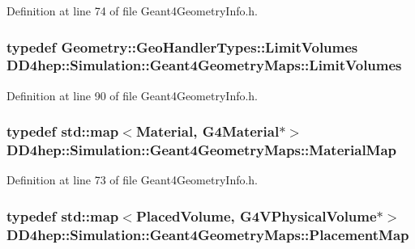 Definition at line 74 of file Geant4GeometryInfo.h.\hypertarget{namespace_d_d4hep_1_1_simulation_1_1_geant4_geometry_maps_a3b9008449a71468a115373b9819457df}{
\subsubsection[{LimitVolumes}]{\setlength{\rightskip}{0pt plus 5cm}typedef {\bf Geometry::GeoHandlerTypes::LimitVolumes} {\bf DD4hep::Simulation::Geant4GeometryMaps::LimitVolumes}}}
\label{namespace_d_d4hep_1_1_simulation_1_1_geant4_geometry_maps_a3b9008449a71468a115373b9819457df}


Definition at line 90 of file Geant4GeometryInfo.h.\hypertarget{namespace_d_d4hep_1_1_simulation_1_1_geant4_geometry_maps_a0ae377c64e684c47bd3045a9d3d8e248}{
\subsubsection[{MaterialMap}]{\setlength{\rightskip}{0pt plus 5cm}typedef std::map$<$Material, G4Material$\ast$$>$ {\bf DD4hep::Simulation::Geant4GeometryMaps::MaterialMap}}}
\label{namespace_d_d4hep_1_1_simulation_1_1_geant4_geometry_maps_a0ae377c64e684c47bd3045a9d3d8e248}


Definition at line 73 of file Geant4GeometryInfo.h.\hypertarget{namespace_d_d4hep_1_1_simulation_1_1_geant4_geometry_maps_a587c0a02d3847f03e6427093c90e93d2}{
\subsubsection[{PlacementMap}]{\setlength{\rightskip}{0pt plus 5cm}typedef std::map$<$PlacedVolume, G4VPhysicalVolume$\ast$$>$ {\bf DD4hep::Simulation::Geant4GeometryMaps::PlacementMap}}}
\label{namespace_d_d4hep_1_1_simulation_1_1_geant4_geometry_maps_a587c0a02d3847f03e6427093c90e93d2}



